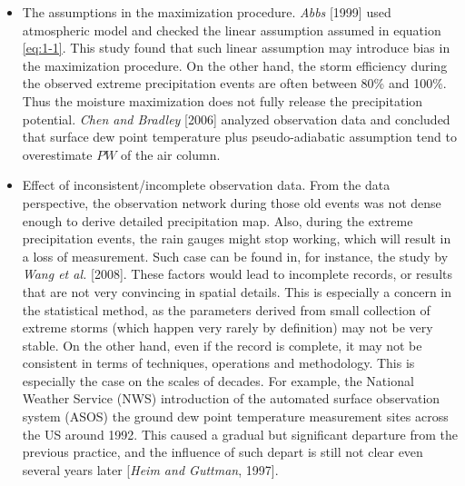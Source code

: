 \begin{itemize}
\item The assumptions in the maximization procedure. \textit{Abbs} [1999] used atmospheric model and checked the linear assumption assumed in equation \ref{eq:1-1}. This study found that such linear assumption may introduce bias in the maximization procedure. On the other hand, the storm efficiency during the observed extreme precipitation events are often between 80\% and 100\%. Thus the moisture maximization does not fully release the precipitation potential. \textit{Chen and Bradley} [2006] analyzed observation data and concluded that surface dew point temperature plus pseudo-adiabatic assumption tend to overestimate $PW$ of the air column.

\item Effect of inconsistent/incomplete observation data. From the data perspective, the observation network during those old events was not dense enough to derive detailed precipitation map. Also, during the extreme precipitation events, the rain gauges might stop working, which will result in a loss of measurement. Such case can be found in, for instance, the study by \textit{Wang et al.} [2008]. These factors would lead to incomplete records, or results that are not very convincing in spatial details. This is especially a concern in the statistical method, as the parameters derived from small collection of extreme storms (which happen very rarely by definition) may not be very stable. On the other hand, even if the record is complete, it may not be consistent in terms of techniques, operations and methodology. This is especially the case on the scales of decades. For example, the National Weather Service (NWS) introduction of the automated surface observation system (ASOS) the ground dew point temperature measurement sites across the US around 1992. This caused a gradual but significant departure from the previous practice, and the influence of such depart is still not clear even several years later [\textit{Heim and Guttman}, 1997].


\end{itemize}
